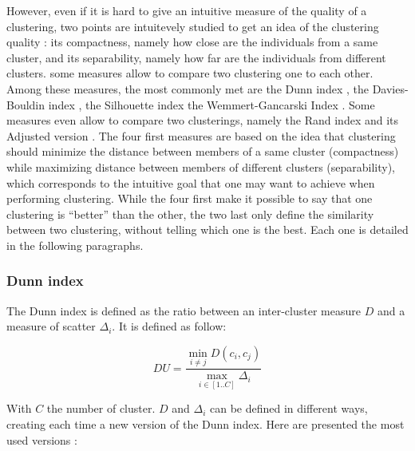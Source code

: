 \documentclass[a4paper]{report}
\begin{document}
    However, even if it is hard to give an intuitive measure of the quality of a clustering, two points are intuitevely studied to get an idea of the clustering quality : its compactness, namely how close are the individuals from a same cluster, and its separability, namely how far are the individuals from different clusters. some measures allow to compare two clustering one to each other. Among these measures, the most commonly met are the Dunn index \cite{dunn1973fuzzy}, the Davies-Bouldin index \cite{davies1979cluster}, the Silhouette index \cite{rousseeuw1987silhouettes} the Wemmert-Gancarski Index \cite{wemmert2000classification}. Some measures even allow to compare two clusterings, namely the Rand index \cite{rand1971objective} and its Adjusted version \cite{hubert1985comparing}. The four first measures are based on the idea that clustering should minimize the distance between members of a same cluster (compactness) while maximizing distance between members of different clusters (separability), which corresponds to the intuitive goal that one may want to achieve when performing clustering.  While the four first make it possible to say that one clustering is ``better'' than the other, the two last only define the similarity between two clustering, without telling which one is the best. Each one is detailed in the following paragraphs.

    \subsubsection{Dunn index}
    The Dunn index is defined as the ratio between an inter-cluster measure $D$ and a measure of scatter $\Delta_i$. It is defined as follow:

    \begin{equation}
        DU = \frac{\min\limits_{i \neq j}D(c_i, c_j)}{\max\limits_{i \in [1..C]} \Delta_i}
        \label{eq:du_index}
    \end{equation}

    With $C$ the number of cluster. $D$ and $\Delta_i$ can be defined in different ways, creating each time a new version of the Dunn index. Here are presented the most used versions :
\end{document}
